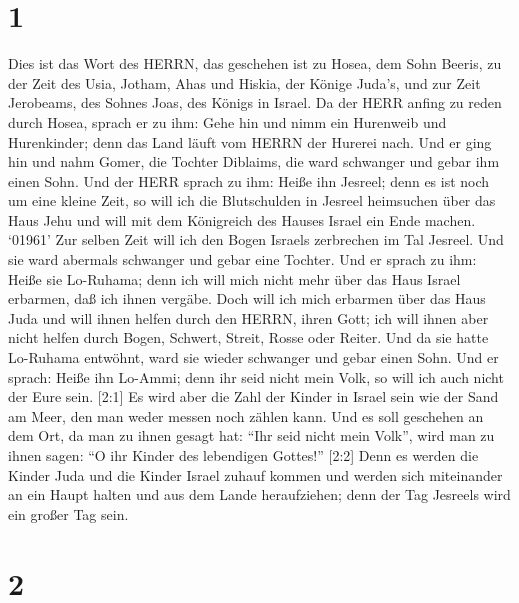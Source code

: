 \hypertarget{section}{%
\section{1}\label{section}}

 Dies ist das Wort des HERRN, das geschehen ist zu Hosea,
dem Sohn Beeris, zu der Zeit des Usia, Jotham, Ahas und Hiskia, der
Könige Juda's, und zur Zeit Jerobeams, des Sohnes Joas, des Königs in
Israel.  Da der HERR anfing zu reden durch Hosea, sprach er
zu ihm: Gehe hin und nimm ein Hurenweib und Hurenkinder; denn das Land
läuft vom HERRN der Hurerei nach.  Und er ging hin und nahm
Gomer, die Tochter Diblaims, die ward schwanger und gebar ihm einen
Sohn.  Und der HERR sprach zu ihm: Heiße ihn Jesreel; denn
es ist noch um eine kleine Zeit, so will ich die Blutschulden in Jesreel
heimsuchen über das Haus Jehu und will mit dem Königreich des Hauses
Israel ein Ende machen.  `01961' Zur selben Zeit will ich
den Bogen Israels zerbrechen im Tal Jesreel.  Und sie ward
abermals schwanger und gebar eine Tochter. Und er sprach zu ihm: Heiße
sie Lo-Ruhama; denn ich will mich nicht mehr über das Haus Israel
erbarmen, daß ich ihnen vergäbe.  Doch will ich mich
erbarmen über das Haus Juda und will ihnen helfen durch den HERRN, ihren
Gott; ich will ihnen aber nicht helfen durch Bogen, Schwert, Streit,
Rosse oder Reiter.  Und da sie hatte Lo-Ruhama entwöhnt,
ward sie wieder schwanger und gebar einen Sohn.  Und er
sprach: Heiße ihn Lo-Ammi; denn ihr seid nicht mein Volk, so will ich
auch nicht der Eure sein.  {[}2:1{]} Es wird aber die Zahl
der Kinder in Israel sein wie der Sand am Meer, den man weder messen
noch zählen kann. Und es soll geschehen an dem Ort, da man zu ihnen
gesagt hat: ``Ihr seid nicht mein Volk'', wird man zu ihnen sagen: ``O
ihr Kinder des lebendigen Gottes!''  {[}2:2{]} Denn es
werden die Kinder Juda und die Kinder Israel zuhauf kommen und werden
sich miteinander an ein Haupt halten und aus dem Lande heraufziehen;
denn der Tag Jesreels wird ein großer Tag sein.

\hypertarget{section-1}{%
\section{2}\label{section-1}}

